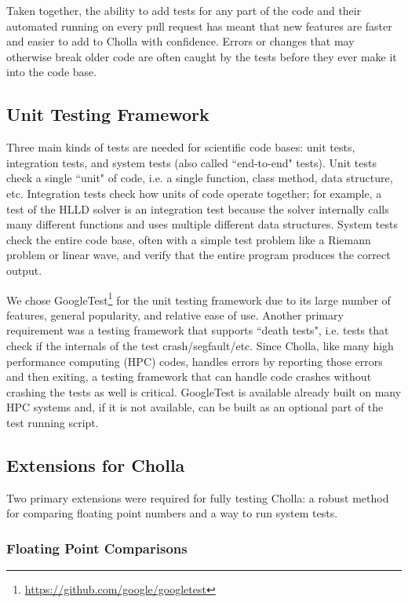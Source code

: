 \documentclass[modern]{aastex631}
\begin{document}
Taken together, the ability to add tests for any part of the code and their automated running on every pull request has meant that new features are faster and easier to add to Cholla with confidence. Errors or changes that may otherwise break older code are often caught by the tests before they ever make it into the code base.

\subsection{Unit Testing Framework}
\label{sec:testing-framework}

Three main kinds of tests are needed for scientific code bases: unit tests, integration tests, and system tests (also called ``end-to-end" tests). Unit tests check a single ``unit" of code, i.e. a single function, class method, data structure, etc. Integration tests check how units of code operate together; for example, a test of the HLLD solver is an integration test because the solver internally calls many different functions and uses multiple different data structures. System tests check the entire code base, often with a simple test problem like a Riemann problem or linear wave, and verify that the entire program produces the correct output.

We chose GoogleTest\footnote{\url{https://github.com/google/googletest}} for the unit testing framework due to its large number of features, general popularity, and relative ease of use. Another primary requirement was a testing framework that supports ``death tests", i.e. tests that check if the internals of the test crash/segfault/etc. Since Cholla, like many high performance computing (HPC) codes, handles errors by reporting those errors and then exiting, a testing framework that can handle code crashes without crashing the tests as well is critical. GoogleTest is available already built on many HPC systems and, if it is not available, can be built as an optional part of the test running script.

\subsection{Extensions for Cholla}

Two primary extensions were required for fully testing Cholla: a robust method for comparing floating point numbers and a way to run system tests.

\subsubsection{Floating Point Comparisons}
\label{sec:fp-comparing}
\end{document}
